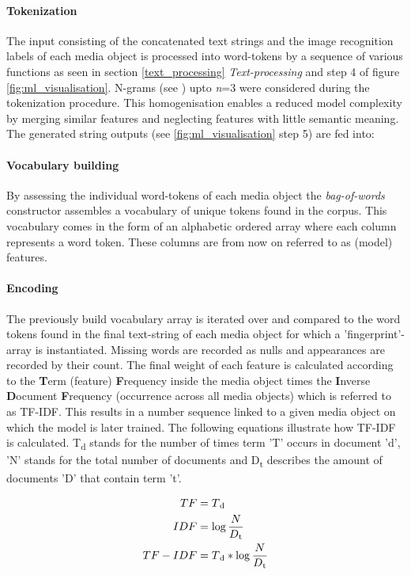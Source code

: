 \paragraph*{Tokenization} The input consisting of the concatenated text strings and the image recognition labels of each media object is processed into word-tokens by a sequence of various functions as seen in section \ref{text_processing} \textit{Text-processing} and step 4 of figure \ref{fig:ml_visualisation}. N-grams (see ) upto \textit{n}=3 were considered during the tokenization procedure. This homogenisation enables a reduced model complexity by merging similar features and neglecting features with little semantic meaning. The generated string outputs (see \ref{fig:ml_visualisation} step 5) are fed into:

\paragraph*{Vocabulary building} By assessing the individual word-tokens of each media object the \textit{bag-of-words} constructor assembles a vocabulary of unique tokens found in the corpus. This vocabulary comes in the form of an alphabetic ordered array where each column represents a word token. These columns are from now on referred to as (model) features.

\paragraph*{Encoding} The previously build vocabulary array is iterated over and compared to the word tokens found in the final text-string of each media object for which a 'fingerprint'-array is instantiated. Missing words are recorded as nulls and appearances are recorded by their count. The final weight of each feature is calculated according to the \textbf{T}erm (feature) \textbf{F}requency inside the media object times the \textbf{I}nverse  \textbf{D}ocument  \textbf{F}requency (occurrence across all media objects) which is referred to as TF-IDF. This results in a number sequence linked to a given media object on which the model is later trained. The following equations illustrate how TF-IDF is calculated. T\textsubscript{d} stands for the number of times term 'T' occurs in document 'd', 'N' stands for the total number of documents and D\textsubscript{t} describes the amount of documents 'D' that contain term 't'.

\begin{align}
TF &= T\textsubscript{d}\\
IDF &= \log\frac{N}{D\textsubscript{t}}\\
TF-IDF &= T\textsubscript{d} * \log\frac{N}{D\textsubscript{t}}
\end{align}


